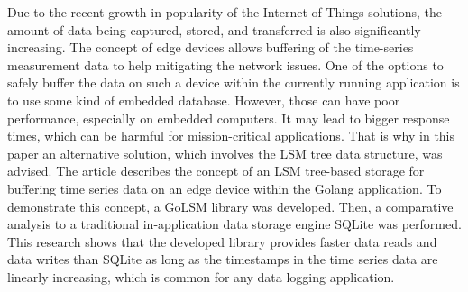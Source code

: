 Due to the recent growth in popularity of the Internet of Things solutions, the amount of data being captured, stored, and transferred is also significantly increasing. The concept of edge devices allows buffering of the time-series measurement data to help mitigating the network issues. 
One of the options to safely buffer the data on such a device within the currently running application is to use some kind of embedded database. However, those can have poor performance, especially on embedded computers. It may lead to bigger response times, which can be harmful for mission-critical applications. That is why in this paper an alternative solution, which involves the LSM tree data structure, was advised.
The article describes the concept of an LSM tree-based storage for buffering time series data on an edge device within the Golang application. To demonstrate this concept, a GoLSM library was developed. Then, a comparative analysis to a traditional in-application data storage engine SQLite was performed. This research shows that the developed library provides faster data reads and data writes than SQLite as long as the timestamps in the time series data are linearly increasing, which is common for any data logging application.